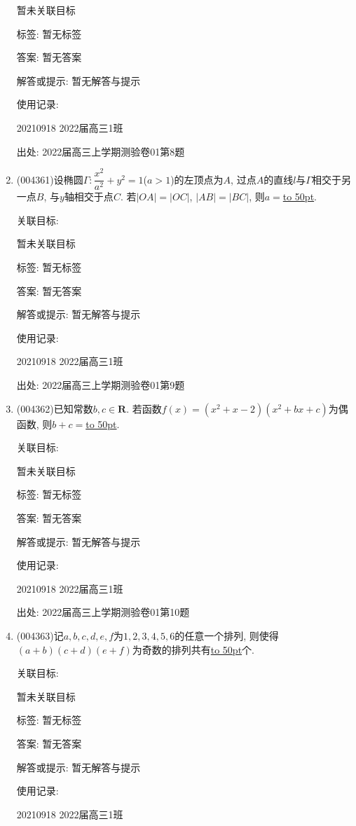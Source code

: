 \documentclass[10pt,a4paper]{article}
\newcommand{\blank}[1]{\underline{\hbox to #1pt{}}}
\begin{document}
\begin{enumerate}[1.]
暂未关联目标



标签: 暂无标签

答案: 暂无答案

解答或提示: 暂无解答与提示

使用记录:

20210918	2022届高三1班	


出处: 2022届高三上学期测验卷01第8题
\item { (004361)}设椭圆$\Gamma:\dfrac{x^2}{a^2}+{y^2}=1$($a>1$)的左顶点为$A$, 过点$A$的直线$l$与$\Gamma$相交于另一点$B$, 与$y$轴相交于点$C$. 若$|OA|=|OC|$, $|AB|=|BC|$, 则$a=$\blank{50}.


关联目标:

暂未关联目标



标签: 暂无标签

答案: 暂无答案

解答或提示: 暂无解答与提示

使用记录:

20210918	2022届高三1班	


出处: 2022届高三上学期测验卷01第9题
\item { (004362)}已知常数$b,c\in \mathbf{R}$. 若函数$f(x)=(x^2+x-2)(x^2+bx+c)$为偶函数, 则$b+c=$\blank{50}.


关联目标:

暂未关联目标



标签: 暂无标签

答案: 暂无答案

解答或提示: 暂无解答与提示

使用记录:

20210918	2022届高三1班	


出处: 2022届高三上学期测验卷01第10题
\item { (004363)}记$a,b,c,d,e,f$为$1,2,3,4,5,6$的任意一个排列, 则使得$(a+b)(c+d)(e+f)$为奇数的排列共有\blank{50}个.


关联目标:

暂未关联目标



标签: 暂无标签

答案: 暂无答案

解答或提示: 暂无解答与提示

使用记录:

20210918	2022届高三1班	



\end{enumerate}
\end{document}
